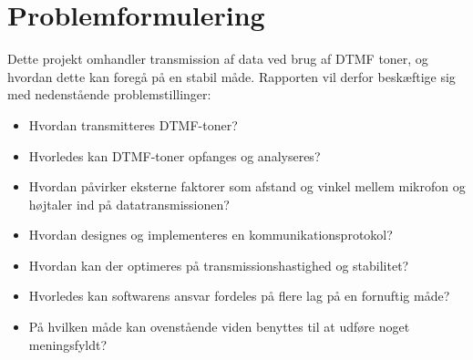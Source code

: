 \newpage
\section{Problemformulering}
Dette projekt omhandler transmission af data ved brug af DTMF toner, og hvordan dette kan foregå på en stabil måde. Rapporten vil derfor beskæftige sig med nedenstående problemstillinger:

\begin{itemize}[noitemsep]
	\item	Hvordan transmitteres DTMF-toner?
	\item	Hvorledes kan DTMF-toner opfanges og analyseres?
	\item 	Hvordan påvirker eksterne faktorer som afstand og vinkel mellem mikrofon og højtaler ind på datatransmissionen?
	\item   Hvordan designes og implementeres en kommunikationsprotokol?
	\item 	Hvordan kan der optimeres på transmissionshastighed og stabilitet?
	\item 	Hvorledes kan softwarens ansvar fordeles på flere lag på en fornuftig måde?
	\item 	På hvilken måde kan ovenstående viden benyttes til at udføre noget meningsfyldt?
\end{itemize}
